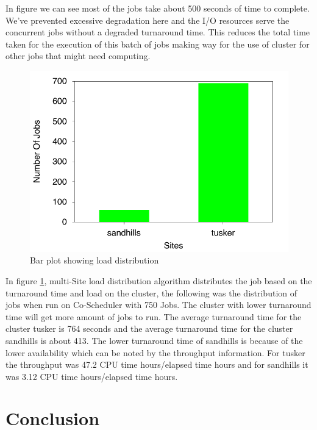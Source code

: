 \documentclass[ms,electronic,double]{nuthesis}
\begin{document}
In figure we can see most of the jobs take about 
500 seconds of time to complete. We've prevented excessive degradation here and 
the I/O resources serve the concurrent jobs without a degraded turnaround time. 
This reduces the total time taken for the execution of this batch of jobs 
making way for the use of cluster for other jobs that might need computing.


\begin{figure}[htbp!]
\begin{center}
\includegraphics{images/multisite_load}
\caption{Bar plot showing load distribution}
\label{fig:multisite_load}
\end{center}
\end{figure}
\FloatBarrier


In figure \ref{fig:multisite_load}, multi-Site load distribution algorithm distributes the job based on the 
turnaround time and load on the cluster, the following was the distribution of jobs when run 
on Co-Scheduler with 750 Jobs. The cluster with lower turnaround time will get more amount of jobs to run. The average turnaround time for 
the cluster tusker is 764 seconds and the average turnaround time for the 
cluster sandhills is about 413. The lower turnaround time of sandhills is 
because of the lower availability which can be noted by the throughput information. 
For tusker the throughput was 47.2 CPU time hours/elapsed time hours and for 
sandhills it was 3.12 CPU time hours/elapsed time hours.


\chapter{Conclusion}
\end{document}
